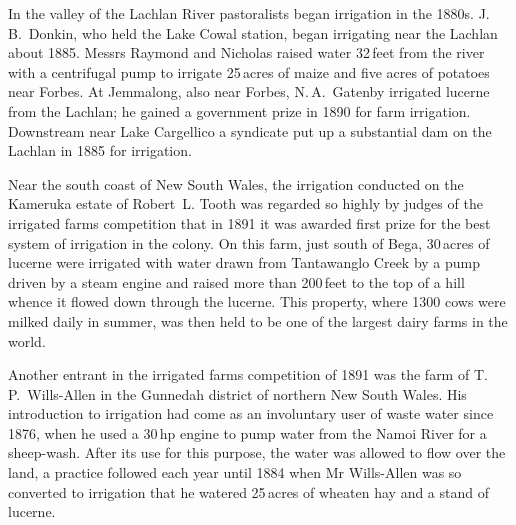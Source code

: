 In the valley of the Lachlan River 
pastoralists began irrigation in the 1880s.
J.\,B.~Donkin,   who held the Lake Cowal
station,  began irrigating near the Lachlan
about 1885.  Messrs Raymond and Nicholas raised water 32\,feet from
the river with a centrifugal pump 
to irrigate 25\,acres of maize and five acres of potatoes
near Forbes.  At Jemmalong,
 also near Forbes, N.\,A.~Gatenby
  irrigated lucerne from the
Lachlan; he gained a government prize  in 1890
for farm irrigation.  Downstream near Lake Cargellico
 a syndicate put up a substantial
dam on the Lachlan in 1885 for
irrigation.

Near the south coast of New South Wales, the irrigation conducted on
the Kameruka  estate of Robert~L. Tooth
 was regarded so highly by judges of the
irrigated farms competition that in 1891 it was awarded first prize
 for the best system of irrigation in the
colony.  On this farm, just south of Bega,  30\,acres
of lucerne were irrigated with water drawn from Tantawanglo Creek
 by a pump driven by a steam engine
 and raised more than
200\,feet to the top of a hill whence it flowed down through the
lucerne.  This property, where 1300 cows were milked daily in summer,
was then held to be one of the largest dairy farms in the
world.

Another entrant in the irrigated farms competition of 1891 was the
farm of T.\,P.~Wills-Allen   in the
Gunnedah  district of
northern New South Wales.  His introduction to irrigation had come as
an involuntary user of waste water since 1876, when he used a 30\,hp
engine to pump water from the Namoi River  for a
sheep-wash.  After its use for this purpose, the water
was allowed to flow over the land, a practice followed each year until
1884 when Mr Wills-Allen was so converted to irrigation that he
watered 25\,acres of wheaten hay and a stand of
lucerne.

